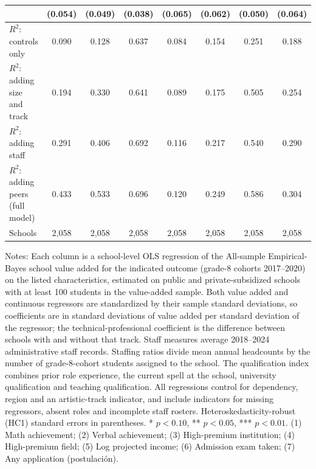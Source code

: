 \begin{table}[!htbp]
{\begin{tabular}{lccccccc}
 & (0.054) & (0.049) & (0.038) & (0.065) & (0.062) & (0.050) & (0.064) \\
\midrule
$R^2$: controls only & 0.090 & 0.128 & 0.637 & 0.084 & 0.154 & 0.251 & 0.188 \\
$R^2$: adding size and track & 0.194 & 0.330 & 0.641 & 0.089 & 0.175 & 0.505 & 0.254 \\
$R^2$: adding staff & 0.291 & 0.406 & 0.692 & 0.116 & 0.217 & 0.540 & 0.290 \\
$R^2$: adding peers (full model) & 0.433 & 0.533 & 0.696 & 0.120 & 0.249 & 0.586 & 0.304 \\
Schools & 2,058 & 2,058 & 2,058 & 2,058 & 2,058 & 2,058 & 2,058 \\
\bottomrule
\end{tabular}}
\par\medskip
\footnotesize
\begin{minipage}{\textwidth}
Notes: Each column is a school-level OLS regression of the All-sample Empirical-Bayes school value added for the indicated outcome (grade-8 cohorts 2017--2020) on the listed characteristics, estimated on public and private-subsidized schools with at least 100 students in the value-added sample. Both value added and continuous regressors are standardized by their sample standard deviations, so coefficients are in standard deviations of value added per standard deviation of the regressor; the technical-professional coefficient is the difference between schools with and without that track. Staff measures average 2018--2024 administrative staff records. Staffing ratios divide mean annual headcounts by the number of grade-8-cohort students assigned to the school. The qualification index combines prior role experience, the current spell at the school, university qualification and teaching qualification. All regressions control for dependency, region and an artistic-track indicator, and include indicators for missing regressors, absent roles and incomplete staff rosters. Heteroskedasticity-robust (HC1) standard errors in parentheses. * $p<0.10$, ** $p<0.05$, *** $p<0.01$. (1) Math achievement; (2) Verbal achievement; (3) High-premium institution; (4) High-premium field; (5) Log projected income; (6) Admission exam taken; (7) Any application (postulaci\'on).
\end{minipage}
\end{table}
